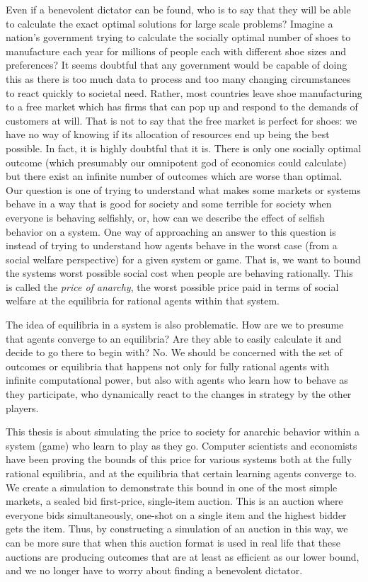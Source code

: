 \documentclass[12pt,twoside]{reedthesis}
\begin{document}
Even if a benevolent dictator can be found, who is to say that they will be able to calculate the exact optimal solutions for large scale problems? Imagine a nation's government trying to calculate the socially optimal number of shoes to manufacture each year for millions of people each with different shoe sizes and preferences? It seems doubtful that any government would be capable of doing this as there is too much data to process and too many changing circumstances to react quickly to societal need. Rather, most countries leave shoe manufacturing to a free market which has firms that can pop up and respond to the demands of customers at will. That is not to say that the free market is perfect for shoes: we have no way of knowing if its allocation of resources end up being the best possible. In fact, it is highly doubtful that it is. There is only one socially optimal outcome (which presumably our omnipotent god of economics could calculate) but there exist an infinite number of outcomes which are worse than optimal. Our question is one of trying to understand what makes some markets or systems behave in a way that is good for society and some terrible for society when everyone is behaving selfishly, or, how can we describe the effect of selfish behavior on a system. One way of approaching an answer to this question is instead of trying to understand how agents behave in the worst case (from a social welfare perspective) for a given system or game. That is, we want to bound the systems worst possible social cost when people are behaving rationally. This is called the {\em price of anarchy}, the worst possible price paid in terms of social welfare  at the equilibria for rational agents within that system. 

The idea of equilibria in a system is also problematic. How are we to presume that agents converge to an equilibria? Are they able to easily calculate it and decide to go there to begin with? No. We should be concerned with the set of outcomes or equilibria that happens not only for fully rational agents with infinite computational power, but also with agents who learn how to behave as they participate, who dynamically react to the changes in strategy by the other players. 

This thesis is about simulating the price to society for anarchic behavior within a system (game) who learn to play as they go. Computer scientists and economists have been proving the bounds of this price for various systems both at the fully rational equilibria, and at the equilibria that certain learning agents converge to. We create a simulation to demonstrate this bound in one of the most simple markets, a sealed bid first-price, single-item auction. This is an auction where everyone bids simultaneously, one-shot on a single item and the highest bidder gets the item. Thus, by constructing a simulation of an auction in this way, we can be more sure that when this auction format is used in real life that these auctions are producing outcomes that are at least as efficient as our lower bound, and we no longer have to worry about finding a benevolent dictator.
	 
\end{document}
